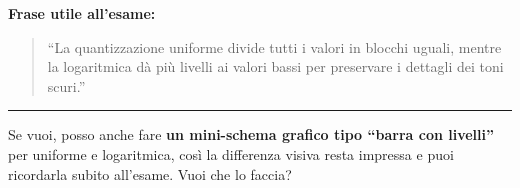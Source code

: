 \documentclass[
]{article}
\begin{document}
\textbf{Frase utile all'esame:}

\begin{quote}
``La quantizzazione uniforme divide tutti i valori in blocchi uguali, mentre la logaritmica dà più livelli ai valori bassi per preservare i dettagli dei toni scuri.''
\end{quote}

\begin{center}\rule{0.5\linewidth}{0.5pt}\end{center}

Se vuoi, posso anche fare \textbf{un mini-schema grafico tipo ``barra con livelli''} per uniforme e logaritmica, così la differenza visiva resta impressa e puoi ricordarla subito all'esame. Vuoi che lo faccia?
\end{document}

